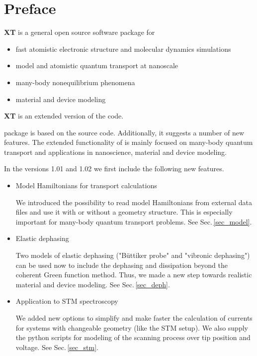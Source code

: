{\new
\chapter*{Preface}

{\bf {\dftbp}XT} is a general open source software package for \\[-0.6cm]
\begin{itemize}
\item fast atomistic electronic structure and molecular dynamics simulations
\item model and atomistic quantum transport at nanoscale 
\item many-body nonequilibrium phenomena
\item material and device modeling
\end{itemize}  

{\bf {\dftbp}XT} is an extended version of the {\bf{\dftbp}} code.
 
{\dftbpxt} package \cite{OpenSuite} is based on the {\dftbp} \cite{dftbp-paper,Pecchia_NJP} source code. Additionally, it suggests a number of new features. The extended functionality of {\dftbpxt} is mainly focused on many-body quantum transport and applications in nanoscience, material and device modeling. 
 
\null
In the versions 1.01 and 1.02 we first include the following new features.

\begin{itemize}

\item Model Hamiltonians for transport calculations

We introduced the possibility to read model Hamiltonians from external data files and use it with or without a geometry structure. This is especially important for many-body quantum transport problems. See Sec.\,\ref{sec_model}.
  
\item Elastic dephasing

Two models of elastic dephasing ("B\"uttiker probe" and "vibronic dephasing") can be used now to include the dephasing and dissipation    beyond the coherent Green function method. Thus, we made a new step towards realistic material and device modeling. See Sec.\,\ref{sec_deph}. 
  
\item Application to STM spectroscopy

We added new options to simplify and make faster the calculation of currents for systems with changeable geometry (like the STM setup). We also supply the python scripts for modeling of the scanning process over tip position and voltage. See Sec.\,\ref{sec_stm}.

\end{itemize}

}